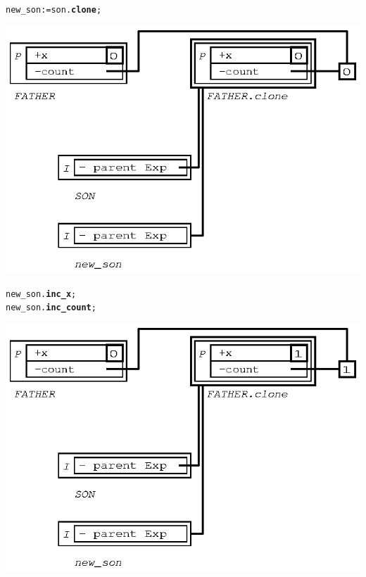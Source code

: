 \documentclass[11pt]{mybook}
\begin{document}
\begin{alltt}
  new\_son := {\sc{}son}.{\bf{}clone};
\end{alltt}
\begin{center}
\includegraphics[scale=1.0]{figures/inherit_expanded_minus_1} 
\end{center}

\begin{alltt}
  new\_son.{\bf{}inc\_x};
  new\_son.{\bf{}inc\_count};
\end{alltt}
\begin{center}
\includegraphics[scale=1.0]{figures/inherit_expanded_minus_2} 
\end{center}
\end{document}
